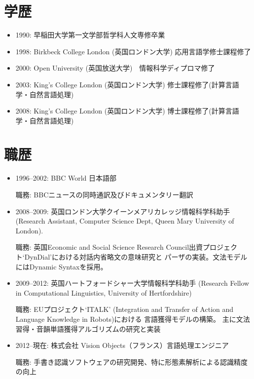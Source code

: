 \documentclass[a4paper]{article}
\begin{document}
\section*{学歴}

\begin{itemize}

  \item 1990: 早稲田大学第一文学部哲学科人文専修卒業

  \item 1998: Birkbeck College London (英国ロンドン大学) 応用言語学修士課程修了

  \item 2000: Open University (英国放送大学)　情報科学ディプロマ修了

  \item 2003: King's College London (英国ロンドン大学) 修士課程修了(計算言語学・自然言語処理)

  \item 2008: King's College London (英国ロンドン大学) 博士課程修了(計算言語学・自然言語処理)

\end{itemize}


\section*{職歴}

\begin{itemize}

\item 1996--2002: BBC World 日本語部 

職務: BBCニュースの同時通訳及びドキュメンタリー翻訳

\item 2008--2009: 英国ロンドン大学クイーンメアリカレッジ情報科学科助手 (Research Assistant, Computer Science Dept, Queen  Mary University of London).

職務: 英国Economic and Social Science Research Council出資プロジェクト`DynDial'における対話内省略文の意味研究と パーザの実装。文法モデルにはDynamic Syntaxを採用。

\item 2009--2012: 英国ハートフォードシャー大学情報科学科助手 (Research Fellow in Computational Linguistics, University of Hertfordshire)

職務: EUプロジェクト`ITALK' (Integration and Transfer of Action and Language Knowledge in Robots)における 言語獲得モデルの構築。 主に文法習得・音韻単語獲得アルゴリズムの研究と実装   \\

\item 2012--現在: 株式会社 Vision Objects（フランス）言語処理エンジニア

職務: 手書き認識ソフトウェアの研究開発、特に形態素解析による認識精度の向上

\end{itemize}
\end{document}
